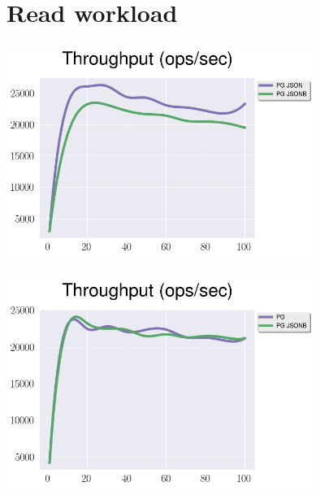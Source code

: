 \documentclass[usenames,dvipsnames, 18pt, compress, aspectratio=169]{beamer}
\begin{document}
\fontsize{13pt}{14}\selectfont
\section{Read workload}
\fontsize{17pt}{18}\selectfont

\begin{frame}
    \frametitle{}
    \begin{center}

        \includegraphics[width=0.75\textwidth,center]{json_vs_jsonb_read.png}

    \end{center}
\end{frame}

\begin{frame}
    \frametitle{}
    \begin{center}

        \includegraphics[width=0.75\textwidth,center]{jsonb_vs_relation_read.png}

    \end{center}
\end{frame}
\end{document}
